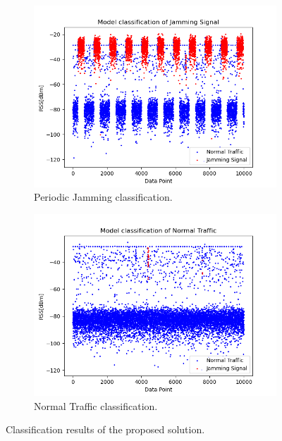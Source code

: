 \documentclass[futureinternet,article,submit,pdftex,moreauthors]{Definitions/mdpi}
\begin{document}
\begin{figure}[H]
	\centering
	\begin{subfigure}{0.45\textwidth}
		\centering
		\includegraphics[width=\textwidth]{img/OnlyPeriodicJamming.png}
		\caption{Periodic Jamming classification.}
		\label{fig:periodicJammingClassification}
	\end{subfigure}
	\hfill
	\begin{subfigure}{0.45\textwidth}
		\centering
		\includegraphics[width=\textwidth]{img/OnlyNormalTraffic.png}
		\caption{Normal Traffic classification.}
		\label{fig:normalTrafficClassification}
	\end{subfigure}
	\caption{Classification results of the proposed solution.}
	\label{fig:proposedSolutionClassification}
\end{figure}
\end{document}
